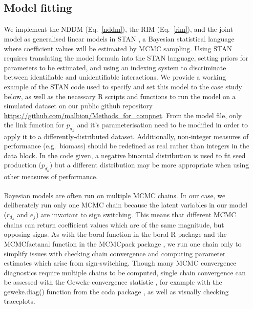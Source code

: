 \documentclass[a4,12pt]{article}
\begin{document}
    \subsection{Model fitting}

        \paragraph{}        
        We implement the NDDM (Eq.~\ref{nddm}), the RIM (Eq.~\ref{rim}), and the joint model as generalised linear models in STAN \parencite{Carpenter2017}, a Bayesian statistical language where coefficient values will be estimated by MCMC sampling. Using STAN requires translating the model formula into the STAN language, setting priors for parameters to be estimated, and using an indexing system to discriminate between identifiable and unidentifiable interactions. We provide a working example of the STAN code used to specify and set this model to the case study below, as well as the necessary R scripts and functions to run the model on a simulated dataset on our public github repository \url{https://github.com/malbion/Methods_for_compnet}.
        From the model file, only the link function for $p_{d_k}$ and it's parameterisation need to be modified in order to apply it to a differently-distributed dataset. Additionally, non-integer measures of performance (e.g.\ biomass) should be redefined as real rather than integers in the data block. In the code given, a negative binomial distribution is used to fit seed production ($p_{d_k}$) but a different distribution may be more appropriate when using other measures of performance.   

        \paragraph{}
        Bayesian models are often run on multiple MCMC chains. In our case, we deliberately run only one MCMC chain because the latent variables in our model ($r_{d_k}$ and $e_j$) are invariant to sign switching. This means that different MCMC chains can return coefficient values which are of the same magnitude, but opposing signs. As with the boral function in the boral R package \parencite{Hui2021} and the MCMCfactanal function in the MCMCpack package \parencite{Martin2011}, we run one chain only to simplify issues with checking chain convergence and computing parameter estimates which arise from sign-switching. Though many MCMC convergence diagnostics require multiple chains to be computed, single chain convergence can be assessed with the Geweke convergence statistic \parencite{Geweke1992}, for example with the geweke.diag() function from the coda package \parencite{Plummer2006}, as well as visually checking traceplots.
\end{document}
